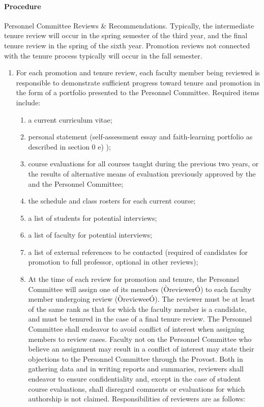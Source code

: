 \documentclass[letterpaper, 11pt]{article}
\begin{document}
			\paragraph{Procedure}
				\label{sec:PromotionEvaluationProcedure}
				Personnel Committee Reviews \& Recommendations.  Typically, the intermediate tenure review will occur in the spring semester of the third year, and the final tenure review in the spring of the sixth year.  Promotion reviews not connected with the tenure process typically will occur in the fall semester.
				\begin{enumerate}[label=\alph*)]
					\item{For each promotion and tenure review, each faculty member being reviewed is responsible to demonstrate sufficient progress toward tenure and promotion in the form of a portfolio presented to the Personnel Committee. Required items include:
						\begin{enumerate}[label=\arabic*)]
							\item{a current curriculum vitae;}
							\item{personal statement (self-assessment essay and faith-learning portfolio as described in section 0 e) );}
							\item{course evaluations for all courses taught during the previous two years, or the results of alternative means of evaluation previously approved by the and the Personnel Committee;}
							\item{the schedule and class rosters for each current course;}
							\item{a list of students for potential interviews;}
							\item{a list of faculty for potential interviews;}
							\item{a list of external references to be contacted (required of candidates for promotion to full professor, optional in other reviews);}
							\item{At the time of each review for promotion and tenure, the Personnel Committee will assign one of its members (ÒreviewerÓ) to each faculty member undergoing review (ÒrevieweeÓ).  The reviewer must be at least of the same rank as that for which the faculty member is a candidate, and must be tenured in the case of a final tenure review.  The Personnel Committee shall endeavor to avoid conflict of interest when assigning members to review cases.  Faculty not on the Personnel Committee who believe an assignment may result in a conflict of interest may state their objections to the Personnel Committee through the Provost.  Both in gathering data and in writing reports and summaries, reviewers shall endeavor to ensure confidentiality and, except in the case of student course evaluations, shall disregard comments or evaluations for which authorship is not claimed.  Responsibilities of reviewers are as follows:}
						\end{enumerate}
					}
				\end{enumerate}
\end{document}
